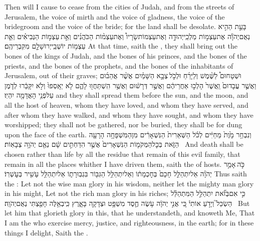 {Then will I cause to cease from the cities of Judah, and from the streets of Jerusalem, the voice of mirth and the voice of gladness, the voice of the bridegroom and the voice of the bride; for the land shall be desolate.}
\newperek
{}
{בָּעֵ֣ת הַהִ֣יא נְאֻם\maqqaf יְהֹוָ֡ה  אֶת\maqqaf עַצְמ֣וֹת מַלְכֵֽי\maqqaf יְהוּדָ֣ה וְאֶת\maqqaf עַצְמוֹת\maqqaf שָׂרָיו֩ וְאֶת\maqqaf עַצְמ֨וֹת הַכֹּהֲנִ֜ים וְאֵ֣ת \legarmeh  עַצְמ֣וֹת הַנְּבִיאִ֗ים וְאֵ֛ת עַצְמ֥וֹת יוֹשְׁבֵֽי\maqqaf יְרוּשָׁלָ֖͏ִם מִקִּבְרֵיהֶֽם׃}
{At that time, saith the \lord, they shall bring out the bones of the kings of Judah, and the bones of his princes, and the bones of the priests, and the bones of the prophets, and the bones of the inhabitants of Jerusalem, out of their graves;}
{וּשְׁטָחוּם֩ לַשֶּׁ֨מֶשׁ וְלַיָּרֵ֜חַ וּלְכֹ֣ל \legarmeh  צְבָ֣א הַשָּׁמַ֗יִם אֲשֶׁ֨ר אֲהֵב֜וּם וַאֲשֶׁ֤ר עֲבָדוּם֙ וַֽאֲשֶׁר֙ הָלְכ֣וּ אַחֲרֵיהֶ֔ם וַאֲשֶׁ֣ר דְּרָשׁ֔וּם וַאֲשֶׁ֥ר הִֽשְׁתַּחֲו֖וּ לָהֶ֑ם לֹ֤א יֵאָֽסְפוּ֙ וְלֹ֣א יִקָּבֵ֔רוּ לְדֹ֛מֶן עַל\maqqaf פְּנֵ֥י הָאֲדָמָ֖ה יִהְיֽוּ׃}
{and they shall spread them before the sun, and the moon, and all the host of heaven, whom they have loved, and whom they have served, and after whom they have walked, and whom they have sought, and whom they have worshipped; they shall not be gathered, nor be buried, they shall be for dung upon the face of the earth.}
{וְנִבְחַ֥ר מָ֙וֶת֙ מֵחַיִּ֔ים לְכֹ֗ל הַשְּׁאֵרִית֙ הַנִּשְׁאָרִ֔ים מִן\maqqaf הַמִּשְׁפָּחָ֥ה הָרָעָ֖ה הַזֹּ֑את בְּכׇל\maqqaf הַמְּקֹמ֤וֹת הַנִּשְׁאָרִים֙ אֲשֶׁ֣ר הִדַּחְתִּ֣ים שָׁ֔ם נְאֻ֖ם יְהֹוָ֥ה צְבָאֽוֹת׃ \setuma }
{And death shall be chosen rather than life by all the residue that remain of this evil family, that remain in all the places whither I have driven them, saith the \lord\space of hosts.}
\newperek
\setcounter{chap}{9}
\setcounter{verse}{22}
{כֹּ֣ה \legarmeh  אָמַ֣ר יְהֹוָ֗ה אַל\maqqaf יִתְהַלֵּ֤ל חָכָם֙ בְּחׇכְמָת֔וֹ וְאַל\maqqaf יִתְהַלֵּ֥ל הַגִּבּ֖וֹר בִּגְבֽוּרָת֑וֹ אַל\maqqaf יִתְהַלֵּ֥ל עָשִׁ֖יר בְּעׇשְׁרֽוֹ׃}
{Thus saith the \lord: Let not the wise man glory in his wisdom, neither let the mighty man glory in his might, Let not the rich man glory in his riches;}
{כִּ֣י אִם\maqqaf בְּזֹ֞את יִתְהַלֵּ֣ל הַמִּתְהַלֵּ֗ל הַשְׂכֵּל֮ וְיָדֹ֣עַ אוֹתִי֒ כִּ֚י אֲנִ֣י יְהֹוָ֔ה עֹ֥שֶׂה חֶ֛סֶד מִשְׁפָּ֥ט וּצְדָקָ֖ה בָּאָ֑רֶץ כִּֽי\maqqaf בְאֵ֥לֶּה חָפַ֖צְתִּי נְאֻם\maqqaf יְהֹוָֽה׃ \setuma }
{But let him that glorieth glory in this, that he understandeth, and knoweth Me, That I am the \lord\space who exercise mercy, justice, and righteousness, in the earth; for in these things I delight, Saith the \lord.}
